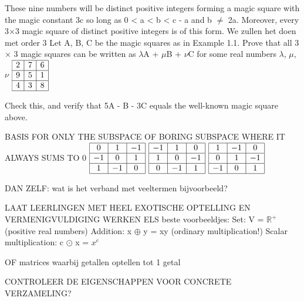 \documentclass{ximera}
\begin{document}
These nine numbers will be distinct positive integers forming a magic square with the magic constant 3c so long as 0 < a < b < c - a and b $\neq$ 2a. Moreover, every 3$\times$3 magic square of distinct positive integers is of this form. 
We zullen het doen met order 3
Let A, B, C be the magic squares as in Example 1.1. Prove that all 3 $\times$ 3
magic squares can be written as $\lambda$A + $\mu$B + $\nu$C for some real numbers $\lambda$, $\mu$, $\nu$
\(
\begin{array}{|c|c|c|}
\hline
2 & 7 & 6 \\
\hline
9 & 5 & 1 \\
\hline
4 & 3 & 8 \\
\hline
\end{array}
\)

Check this, and verify that 5A - B - 3C equals the well-known magic square above.

BASIS FOR ONLY THE SUBSPACE OF BORING SUBSPACE WHERE IT ALWAYS SUMS TO
0
\(
\begin{array}{|c|c|c|}
\hline
0 & 1 & -1 \\
\hline
-1 & 0 & 1 \\
\hline
1 & -1 & 0 \\
\hline
\end{array}
\)
\(
\begin{array}{|c|c|c|}
\hline
-1 & 1 & 0 \\
\hline
1 & 0 & -1 \\
\hline
0 & -1 & 1 \\
\hline
\end{array}
\)
\(
\begin{array}{|c|c|c|}
\hline
1 & -1 & 0 \\
\hline
0 & 1 & -1 \\
\hline
-1 & 0 & 1 \\
\hline
\end{array}
\)

DAN ZELF: wat is het verband met veeltermen bijvoorbeeld?

LAAT LEERLINGEN MET HEEL EXOTISCHE OPTELLING EN VERMENIGVULDIGING WERKEN
ELS beste voorbeeldjes:
Set: V = $\mathbb{R}^{+}$ (positive real numbers)
Addition: x $\oplus$ y = xy (ordinary multiplication!)
Scalar multiplication: c $\odot$ x = $x^c$

OF matrices waarbij getallen optellen tot 1 getal


CONTROLEER DE EIGENSCHAPPEN VOOR CONCRETE VERZAMELING?
\end{document}

